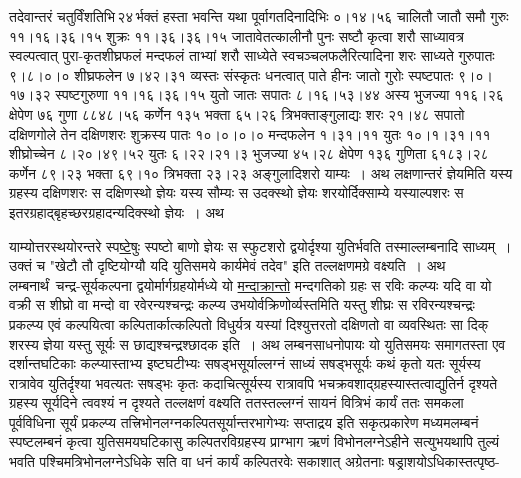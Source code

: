 \documentclass[11pt, openany]{book}
\begin{document}
\newpage

\begin{sloppypar}
\noindent तदेवान्तरं चतुर्विंशतिभि\textendash \,२४\textendash \,र्भक्तं हस्ता भवन्ति यथा पूर्वागतदिनादिभिः ०।१४।५६ चालितौ जातौ समौ गुरुः ११।१६।३६।१५ शुक्रः ११।३६।३६।१५ जातावेतत्कालीनौ पुनः सष्टौ कृत्वा शरौ साध्यावत्र स्वल्पत्वात् पुरा-कृतशीघ्रफलं मन्दफलं ताभ्यां शरौ साध्येते स्वचञ्चलफलैरित्यादिना शरः साध्यते गुरुपातः ९।८।०।० शीघ्रफलेन ७।४२।३१ व्यस्तः संस्कृतः धनत्वात् पाते हीनः जातो गुरोः स्पष्टपातः ९।०।१७।३२ स्पष्टगुरुणा ११।१६।३६।१५ युतो जातः सपातः ८।१६।५३।४४ अस्य भुजज्या ११६।२६ क्षेपेण ७६ गुणा ८८४८।५६ कर्णेन १३५ भक्ता ६५।२६ त्रिभक्ताङ्गुलाद्यः शरः २१।४८ सपातो दक्षिणगोले तेन दक्षिणशरः शुक्रस्य पातः १०।०।०।० मन्दफलेन १।३१।११ युतः १०।१।३१।११ शीघ्रोच्चेन ८।२०।४९।५२ युतः ६।२२।२१।३ भुजज्या ४५।२८ क्षेपेण १३६ गुणिता ६१८३।२८ कर्णेन ८९।२३ भक्ता ६९।१० त्रिभक्ता २३।२३ अङ्गुलादिशरो याम्यः~। अथ लक्षणान्तरं ज्ञेयमिति यस्य ग्रहस्य दक्षिणशरः स दक्षिणस्थो ज्ञेयः यस्य सौम्यः स उदक्स्थो ज्ञेयः शरयोर्दिक्साम्ये यस्याल्पशरः स इतरग्रहाद्बृहच्छरग्रहादन्यदिक्स्थो ज्ञेयः~। अथ
\end{sloppypar}

\newpage

\begin{sloppypar}
\noindent याम्योत्तरस्थयोरन्तरे स्प\hyperref[8.5]{ष्टेषुः} स्पष्टो बाणो ज्ञेयः स स्फुटशरो द्वयोर्दृश्या युतिर्भवति तस्माल्लम्बनादि साध्यम्~। उक्तं च {\color{violet}"खेटौ तौ दृष्टियोग्यौ यदि युतिसमये कार्यमेवं तदेव"} इति तल्लक्षणमग्रे वक्ष्यति~। अथ लम्बनार्थं~चन्द्र-सूर्यकल्पना द्वयोर्मार्गग्रहयोर्मध्ये यो \hyperref[8.6]{मन्दाक्रान्तो} मन्दगतिको ग्रहः स रविः कल्प्यः यदि वा यो वक्री स शीघ्रो वा मन्दो वा रवेरन्यश्चन्द्रः कल्प्य उभयोर्वक्रिणोर्व्यस्तमिति यस्तु शीघ्रः स रविरन्यश्चन्द्रः प्रकल्प्य एवं कल्पयित्वा कल्पितार्कात्कल्पितो विधुर्यत्र यस्यां दिश्युत्तरतो दक्षिणतो वा व्यवस्थितः सा दिक् शरस्य ज्ञेया यस्तु सूर्यः स छाद्यश्चन्द्रश्छादक इति~। अथ लम्बनसाधनोपायः यो युतिसमयः समागतस्ता एव दर्शान्तघटिकाः कल्प्यास्ताभ्य इष्टघटीभ्यः सषड्भसूर्याल्लग्नं साध्यं सषड्भसूर्यः कथं कृतो यतः सूर्यस्य रात्रावेव युतिर्दृश्या भवत्यतः सषड्भः कृतः कदाचित्सूर्यस्य रात्रावपि भचक्रवशाद्ग्रहस्यास्तत्वाद्युतिर्न दृश्यते ग्रहस्य सूर्यदिने त्ववश्यं न दृश्यते तल्लक्षणं वक्ष्यति ततस्तल्लग्नं सायनं वित्रिभं कार्यं ततः समकला पूर्वविधिना सूर्यं प्रकल्प्य तत्त्रिभोनलग्नकल्पितसूर्यान्तरभागेभ्यः सप्ताद्रय इति सकृत्प्रकारेण मध्यमलम्बनं स्पष्टलम्बनं कृत्वा युतिसमयघटिकासु कल्पितरविग्रहस्य प्राग्भाग ऋणं विभोनलग्नेऽहीने सत्युभयथापि तुल्यं भवति पश्चिमत्रिभोनलग्नेऽधिके सति वा धनं कार्यं कल्पितरवेः सकाशात् अग्रेतनाः षड्राशयोऽधिकास्तत्पृष्ठ-
\end{sloppypar}
\end{document}
